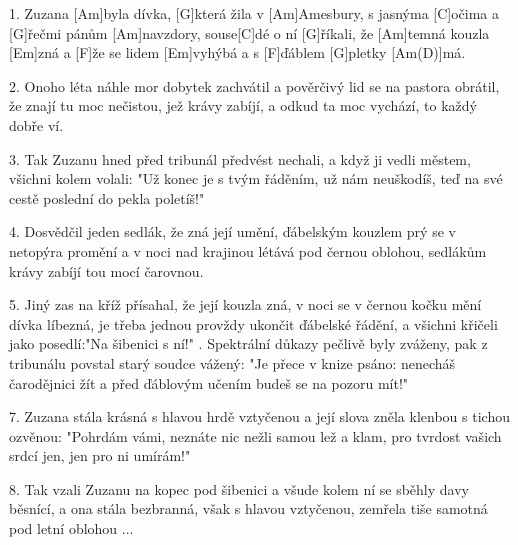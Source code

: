 
1. Zuzana [Am]byla dívka, [G]která žila v [Am]Amesbury,
s jasnýma [C]očima a [G]\null řečmi pánům [Am]navzdory,
souse[C]dé o ní [G]\null říkali, že [Am]temná kouzla [Em]zná
a [F]\null že se lidem [Em]vyhýbá a s [F]\null ďáblem [G]pletky [Am(D)]má.
\begin{multicols}{2}
	
2. Onoho léta náhle mor dobytek zachvátil
a pověrčivý lid se na pastora obrátil,
že znají tu moc nečistou, jež krávy zabíjí,
a odkud ta moc vychází, to každý dobře ví.

3. Tak Zuzanu hned před tribunál předvést nechali,
a když ji vedli městem, všichni kolem volali:
"Už konec je s tvým řáděním, už nám neuškodíš,
teď na své cestě poslední do pekla poletíš!"

4. Dosvědčil jeden sedlák, že zná její umění,
ďábelským kouzlem prý se v netopýra promění
a v noci nad krajinou létává pod černou oblohou,
sedlákům krávy zabíjí tou mocí čarovnou.

5. Jiný zas na kříž přísahal, že její kouzla zná,
v noci se v černou kočku mění dívka líbezná,
je třeba jednou provždy ukončit ďábelské řádění,
a všichni křičeli jako posedlí:"Na šibenici s ní!"
. Spektrální důkazy pečlivě byly zváženy,
pak z tribunálu povstal starý soudce vážený:
"Je přece v knize psáno: nenecháš čarodějnici žít
a před ďáblovým učením budeš se na pozoru mít!"

7. Zuzana stála krásná s hlavou hrdě vztyčenou
a její slova zněla klenbou s tichou ozvěnou:
"Pohrdám vámi, neznáte nic nežli samou lež a klam,
pro tvrdost vašich srdcí jen, jen pro ni umírám!"

8. Tak vzali Zuzanu na kopec pod šibenici
a všude kolem ní se sběhly davy běsnící,
a ona stála bezbranná, však s hlavou vztyčenou,
zemřela tiše samotná pod letní oblohou ...
\end{multicols}

